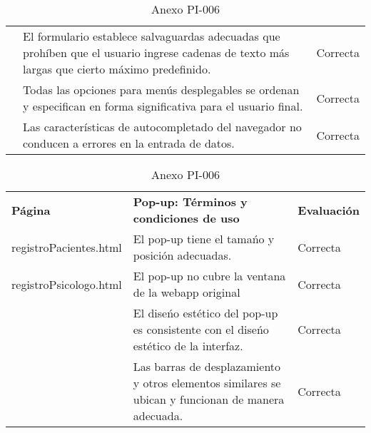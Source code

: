 \begin{table}[htpb]
\begin{tabularx}{\textwidth}{|l|X|l|}
                                          & El formulario establece salvaguardas adecuadas que prohíben que el usuario ingrese cadenas de texto más largas que cierto máximo predefinido.             & Correcta            \\ \cline{2-3} 
                                          & Todas las opciones para menús desplegables se ordenan y especifican en forma significativa para el usuario final.                                         & Correcta            \\ \cline{2-3} 
                                          & Las características de autocompletado del navegador no conducen a errores en la entrada de datos.                                                         & Correcta            \\ \hline
\end{tabularx}
\caption{Anexo PI-006}
\end{table}


\begin{table}[htpb]
\centering
\begin{tabularx}{\textwidth}{|l|X|l|}
\hline
\rowcolor[gray]{0.9}\multicolumn{3}{|l|}{\textbf{Anexo PI-006}}                                                                                                                                                  \\ \hline
\textbf{Página}                                                  & \textbf{Pop-up: Términos y condiciones de uso}                                                     & \textbf{Evaluación} \\ \hline
registroPacientes.html & El pop-up tiene el tamańo y posición adecuadas.                                                    & Correcta            \\ \cline{2-3} 
registroPsicologo.html                                                                 & El pop-up no cubre la ventana de la webapp original                                                & Correcta            \\ \cline{2-3} 
                                                                 & El diseńo estético del pop-up es consistente con el diseńo estético de la interfaz.                & Correcta            \\ \cline{2-3} 
                                                                 & Las barras de desplazamiento y otros elementos similares se ubican y funcionan de manera adecuada. & Correcta            \\ \hline
\end{tabularx}
\caption{Anexo PI-006}
\end{table}


